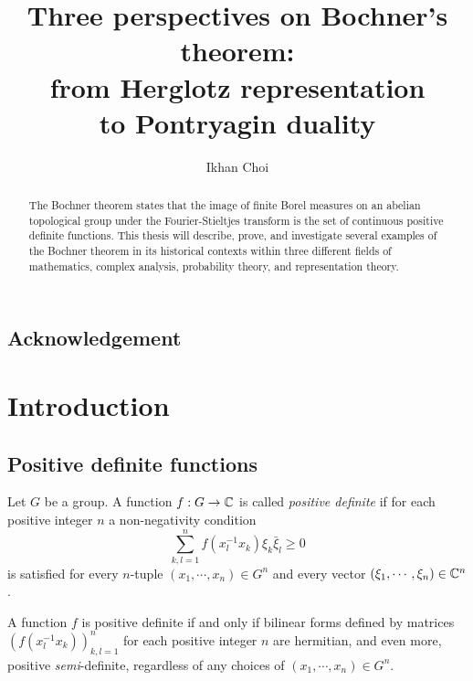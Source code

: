 \documentclass[12pt]{article}
\title{Three perspectives on Bochner's theorem:\\from Herglotz representation\\to Pontryagin duality}
\author{Ikhan Choi}
\begin{document}
\maketitle
\begin{abstract}
The Bochner theorem states that the image of finite Borel measures on an abelian topological group under the Fourier-Stieltjes transform is the set of continuous positive definite functions.
This thesis will describe, prove, and investigate several examples of the Bochner theorem in its historical contexts within three different fields of mathematics, complex analysis, probability theory, and representation theory.
\end{abstract}
\newpage
\tableofcontents

\subsection*{Acknowledgement}











\newpage
\section{Introduction}


\subsection{Positive definite functions}
\begin{defn}
Let $G$ be a group.
A function $f:G\to\mathbb{C}$ is called \emph{positive definite} if for each positive integer $n$ a non-negativity condition
\[\sum_{k,l=1}^nf(x_l^{-1}x_k)\xi_k\bar\xi_l\ge0\]
is satisfied for every $n$-tuple $(x_1,\cdots,x_n)\in G^n$ and every vector $(\xi_1,\cdots,\xi_n)\in\mathbb{C}^n$.
\end{defn}
A function $f$ is positive definite if and only if bilinear forms defined by matrices $(f(x_l^{-1}x_k))_{k,l=1}^n$ for each positive integer $n$ are hermitian, and even more, positive \emph{semi}-definite, regardless of any choices of $(x_1,\cdots,x_n)\in G^n$.
\end{document}

